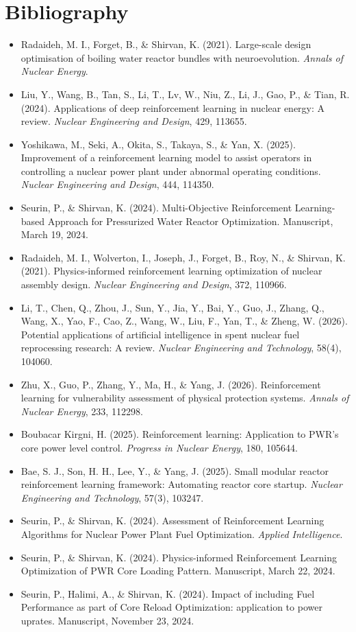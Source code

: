 \documentclass{article}
\begin{document}
\newpage
\section{Bibliography}
\begin{itemize}
    \item Radaideh, M. I., Forget, B., \& Shirvan, K. (2021). Large-scale design optimisation of boiling water reactor bundles with neuroevolution. \textit{Annals of Nuclear Energy}.
    \item Liu, Y., Wang, B., Tan, S., Li, T., Lv, W., Niu, Z., Li, J., Gao, P., \& Tian, R. (2024). Applications of deep reinforcement learning in nuclear energy: A review. \textit{Nuclear Engineering and Design}, 429, 113655.
    \item Yoshikawa, M., Seki, A., Okita, S., Takaya, S., \& Yan, X. (2025). Improvement of a reinforcement learning model to assist operators in controlling a nuclear power plant under abnormal operating conditions. \textit{Nuclear Engineering and Design}, 444, 114350.
    \item Seurin, P., \& Shirvan, K. (2024). Multi-Objective Reinforcement Learning-based Approach for Pressurized Water Reactor Optimization. Manuscript, March 19, 2024.
    \item Radaideh, M. I., Wolverton, I., Joseph, J., Forget, B., Roy, N., \& Shirvan, K. (2021). Physics-informed reinforcement learning optimization of nuclear assembly design. \textit{Nuclear Engineering and Design}, 372, 110966.
    \item Li, T., Chen, Q., Zhou, J., Sun, Y., Jia, Y., Bai, Y., Guo, J., Zhang, Q., Wang, X., Yao, F., Cao, Z., Wang, W., Liu, F., Yan, T., \& Zheng, W. (2026). Potential applications of artificial intelligence in spent nuclear fuel reprocessing research: A review. \textit{Nuclear Engineering and Technology}, 58(4), 104060.
    \item Zhu, X., Guo, P., Zhang, Y., Ma, H., \& Yang, J. (2026). Reinforcement learning for vulnerability assessment of physical protection systems. \textit{Annals of Nuclear Energy}, 233, 112298.
    \item Boubacar Kirgni, H. (2025). Reinforcement learning: Application to PWR's core power level control. \textit{Progress in Nuclear Energy}, 180, 105644.
    \item Bae, S. J., Son, H. H., Lee, Y., \& Yang, J. (2025). Small modular reactor reinforcement learning framework: Automating reactor core startup. \textit{Nuclear Engineering and Technology}, 57(3), 103247.
    \item Seurin, P., \& Shirvan, K. (2024). Assessment of Reinforcement Learning Algorithms for Nuclear Power Plant Fuel Optimization. \textit{Applied Intelligence}.
    \item Seurin, P., \& Shirvan, K. (2024). Physics-informed Reinforcement Learning Optimization of PWR Core Loading Pattern. Manuscript, March 22, 2024.
    \item Seurin, P., Halimi, A., \& Shirvan, K. (2024). Impact of including Fuel Performance as part of Core Reload Optimization: application to power uprates. Manuscript, November 23, 2024.
\end{itemize}
\end{document}
